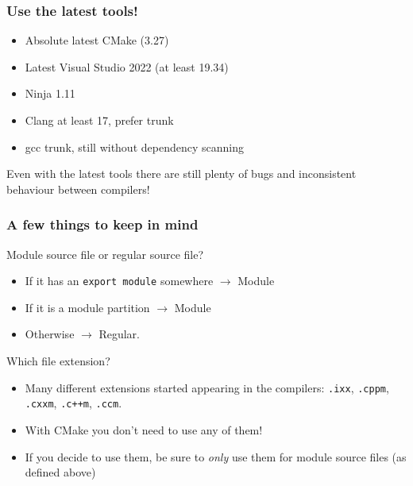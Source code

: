 \documentclass[aspectratio=169]{beamer}
\newif\iftransitions
\newcommand{\cpause}{\iftransitions \pause \fi}
\begin{document}
\begin{frame}
  \frametitle{Use the latest tools!}

  \begin{itemize}
  \item Absolute latest CMake (3.27)
  \item Latest Visual Studio 2022 (at least 19.34)
  \item Ninja 1.11
  \item Clang at least 17, prefer trunk
  \item gcc trunk, still without dependency scanning
  \end{itemize}

  Even with the latest tools there are still plenty of bugs and inconsistent behaviour between compilers!
\end{frame}


\begin{frame}[fragile]

  \frametitle{A few things to keep in mind}

  Module source file or regular source file?
  \begin{itemize}
  \item If it has an \texttt{export module} somewhere $\rightarrow$ Module
  \item If it is a module partition $\rightarrow$ Module
  \item Otherwise $\rightarrow$ Regular.
  \end{itemize}

  \cpause
  Which file extension?
  \begin{itemize}
  \item Many different extensions started appearing in the compilers: \texttt{.ixx}, \texttt{.cppm}, \texttt{.cxxm}, \texttt{.c++m}, \texttt{.ccm}.
  \item With CMake you don't need to use any of them!
  \item If you decide to use them, be sure to \textit{only} use them for module source files (as defined above)
  \end{itemize}

\end{frame}

%
\end{document}

